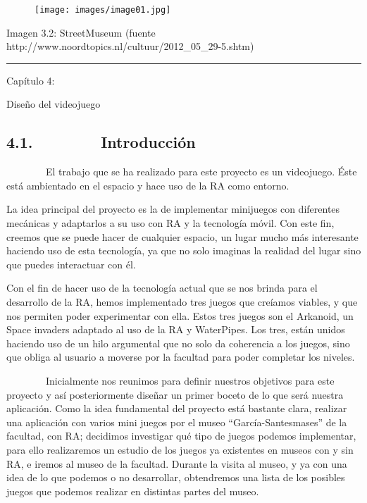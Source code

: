 \begin{figure}[htbp]
\centering
\texttt{[image: images/image01.jpg]}
\end{figure}

Imagen 3.2: StreetMuseum (fuente
http://www.noordtopics.nl/cultuur/2012\_05\_29-5.shtm)

\begin{center}\rule{3in}{0.4pt}\end{center}

Capítulo 4:

Diseño del videojuego

\subsection{4.1.~~~~~~~~Introducción}\label{introducciuxf3n}

~~~~~~~~El trabajo que se ha realizado para este proyecto es un
videojuego. Éste está ambientado en el espacio y hace uso de la RA como
entorno.

La idea principal del proyecto es la de implementar minijuegos con
diferentes mecánicas y adaptarlos a su uso con RA y la tecnología móvil.
Con este fin, creemos que se puede hacer de cualquier espacio, un lugar
mucho más interesante haciendo uso de esta tecnología, ya que no solo
imaginas la realidad del lugar sino que puedes interactuar con
él.~~~~~~~~

Con el fin de hacer uso de la tecnología actual que se nos brinda para
el desarrollo de la RA, hemos implementado tres juegos que creíamos
viables, y que nos permiten poder experimentar con ella. Estos tres
juegos son el Arkanoid, un Space invaders adaptado al uso de la RA y
WaterPipes. Los tres, están unidos haciendo uso de un hilo argumental
que no solo da coherencia a los juegos, sino que obliga al usuario a
moverse por la facultad para poder completar los niveles.


~~~~~~~~Inicialmente nos reunimos para definir nuestros objetivos para
este proyecto y así posteriormente diseñar un primer boceto de lo que
será nuestra aplicación. Como la idea fundamental del proyecto está
bastante clara, realizar una aplicación con varios mini juegos por el
museo ``García-Santesmases'' de la facultad, con RA; decidimos
investigar qué tipo de juegos podemos implementar, para ello
realizaremos un estudio de los juegos ya existentes en museos con y sin
RA, e iremos al museo de la facultad. Durante la visita al museo, y ya
con una idea de lo que podemos o no desarrollar, obtendremos una lista
de los posibles juegos que podemos realizar en distintas partes del
museo.

